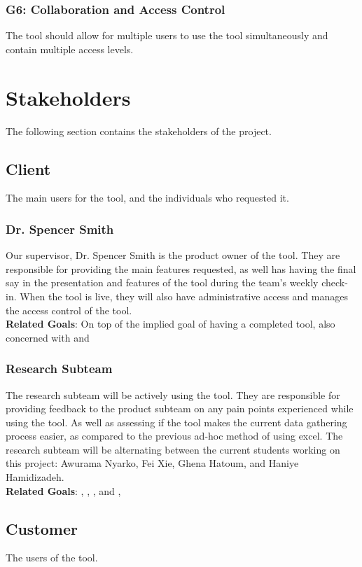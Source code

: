 \documentclass[12pt]{article}
\begin{document}
\subsubsection{G6: Collaboration and Access Control} \label{goal-collab}
The tool should allow for multiple users to use the tool simultaneously and contain multiple access levels.
\section{Stakeholders}
The following section contains the stakeholders of the project.
\subsection{Client}
The main users for the tool, and the individuals who requested it.
\subsubsection{Dr. Spencer Smith}\label{smith}
Our supervisor, Dr. Spencer Smith is the product owner of the tool.
They are responsible for providing the main features requested, as well has having the final say in the presentation and features of the tool during the team's weekly check-in.
When the tool is live, they will also have administrative access and manages the access control of the tool. \\
\textbf{Related Goals}: On top of the implied goal of having a completed tool, also concerned with  and 

\subsubsection{Research Subteam}\label{research_team}
The research subteam will be actively using the tool. They are responsible for providing feedback to the product subteam on any pain points experienced while using the tool.
As well as assessing if the tool makes the current data gathering process easier, as compared to the previous ad-hoc method of using excel. The research subteam will be alternating between the current students working on this project: Awurama Nyarko, Fei Xie, Ghena Hatoum, and Haniye Hamidizadeh. \\
\textbf{Related Goals}: , , , and ,

\subsection{Customer}
The users of the tool.
\end{document}
